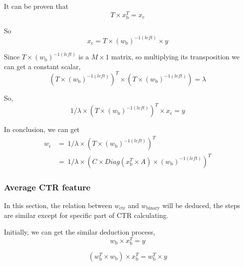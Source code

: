 \documentclass{sig-alternate}
\begin{document}
It can be proven that 
\begin{equation}
T \times x_{\text{b}}^T =  x_{\text{c}}
\end{equation}

So
\begin{equation}
x_{\text{c}} =  T \times (w_{\text{b}})^{-1(left)} \times y 
\end{equation}

Since \(T \times (w_{\text{b}})^{-1(left)}\) is a \(M \times 1\) matrix, so multiplying its transposition we can get a constant scalar, 
\begin{equation}
(T \times (w_{\text{b}})^{-1(left)})^T \times (T \times (w_{\text{b}})^{-1(left)}) = \lambda
\end{equation}

So, 
\begin{equation}
1/{\lambda} \times (T \times (w_{\text{b}})^{-1(left)})^T \times x_{\text{c}} =  y
\end{equation}

In conclusion, we can get
\begin{equation} \label{eq:12}
\begin{split}
w_{\text{c}} & =\ 1/{\lambda} \times (T \times (w_{\text{b}})^{-1(left)})^T \\
& = \ 1/{\lambda} \times (C \times Diag(x_{\text{b}}^T \times A) \times (w_{\text{b}})^{-1(left)})^T
\end{split}
\end{equation}

\subsubsection{Average CTR feature}

\setlength{\parindent}{5ex}

In this section, the relation between  \(w_{\text{ctr}}\) and \(w_{\text{binary}}\) will be deduced, the steps are similar except for specific part of CTR calculating. \vspace{3mm}

Initially, we can get the similar deduction process, 
\begin{equation}
w_{\text{b}} \times x_{\text{b}}^T = y 
\end{equation}

\begin{equation}
(w_{\text{b}}^T \times w_{\text{b}}) \times x_{\text{b}}^T = w_{\text{b}}^T \times y 
\end{equation}
\end{document}
